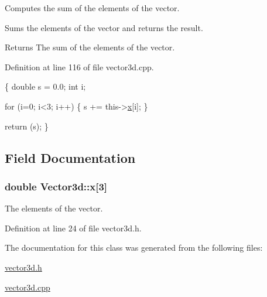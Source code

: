 Computes the sum of the elements of the vector. 

Sums the elements of the vector and returns the result. \begin{DoxyReturn}{Returns}
The sum of the elements of the vector. 
\end{DoxyReturn}


Definition at line 116 of file vector3d.\-cpp.


\begin{DoxyCode}
\{
  \textcolor{keywordtype}{double} s = 0.0;
  \textcolor{keywordtype}{int} i;
  
  \textcolor{keywordflow}{for} (i=0; i<3; i++)
    \{
      s += this->\hyperlink{classVector3d_ae5e82a2be7cc2e195e56875a5befe509}{x}[i];
    \}
  
  \textcolor{keywordflow}{return} (s);
\}
\end{DoxyCode}


\subsection{Field Documentation}
\hypertarget{classVector3d_ae5e82a2be7cc2e195e56875a5befe509}{
\subsubsection[{x}]{\setlength{\rightskip}{0pt plus 5cm}double Vector3d\-::x\mbox{[}3\mbox{]}\hspace{0.3cm}{\ttfamily [protected]}}}\label{df/dd0/classVector3d_ae5e82a2be7cc2e195e56875a5befe509}


The elements of the vector. 



Definition at line 24 of file vector3d.\-h.



The documentation for this class was generated from the following files\-:\begin{DoxyCompactItemize}
\item 
\hyperlink{vector3d_8h}{vector3d.\-h}\item 
\hyperlink{vector3d_8cpp}{vector3d.\-cpp}\end{DoxyCompactItemize}
